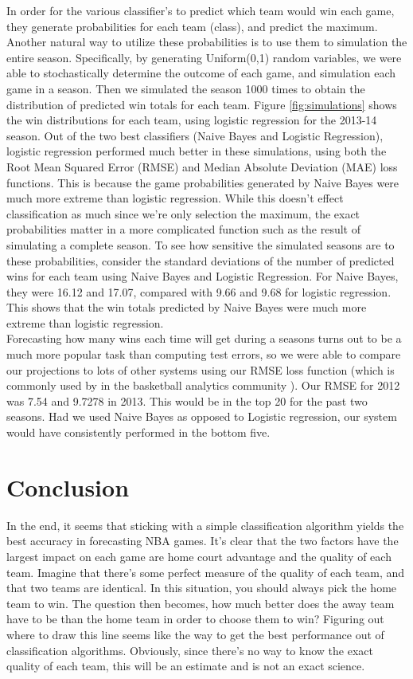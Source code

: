 \documentclass{article} %
\begin{document}
In order for the various classifier's to predict which team would win each game, they generate probabilities for each team (class), and predict the maximum. Another natural way to utilize these probabilities is to use them to simulation the entire season. Specifically, by generating Uniform(0,1) random variables, we were able to stochastically determine the outcome of each game, and simulation each game in a season. Then we simulated the season 1000 times to obtain the distribution of predicted win totals for each team. Figure \ref{fig:simulations} shows the win distributions for each team, using logistic regression for the 2013-14 season. Out of the two best classifiers (Naive Bayes and Logistic Regression), logistic regression performed much better in these simulations, using both the Root Mean Squared Error (RMSE) and Median Absolute Deviation (MAE) loss functions. This is because the game probabilities generated by Naive Bayes were much more extreme than logistic regression. While this doesn't effect classification as much since we're only selection the maximum, the exact probabilities matter in a more complicated function such as the result of simulating a complete season. To see how sensitive the simulated seasons are to these probabilities, consider the standard deviations of the number of predicted wins for each team using Naive Bayes and Logistic Regression. For Naive Bayes, they were 16.12 and 17.07, compared with 9.66 and 9.68 for logistic regression. This shows that the win totals predicted by Naive Bayes were much more extreme than logistic regression. \\

Forecasting how many wins each time will get during a seasons turns out to be a much more popular task than computing test errors, so we were able to compare our projections to lots of other systems using our RMSE loss function (which is commonly used by in the basketball analytics community \cite{projections}). Our RMSE for 2012 was 7.54 and 9.7278 in 2013. This would be in the top 20 for the past two seasons. Had we used Naive Bayes as opposed to Logistic regression, our system would have consistently performed in the bottom five. 


\section {Conclusion}
In the end, it seems that sticking with a simple classification algorithm yields the best accuracy in forecasting NBA games. It's clear that the two factors have the largest impact on each game are home court advantage and the quality of each team. Imagine that there's some perfect measure of the quality of each team, and that two teams are identical. In this situation, you should always pick the home team to win. The question then becomes, how much better does the away team have to be than the home team in order to choose them to win? Figuring out where to draw this line seems like the way to get the best performance out of classification algorithms. Obviously, since there's no way to know the exact quality of each team, this will be an estimate and is not an exact science. \\
\end{document}
